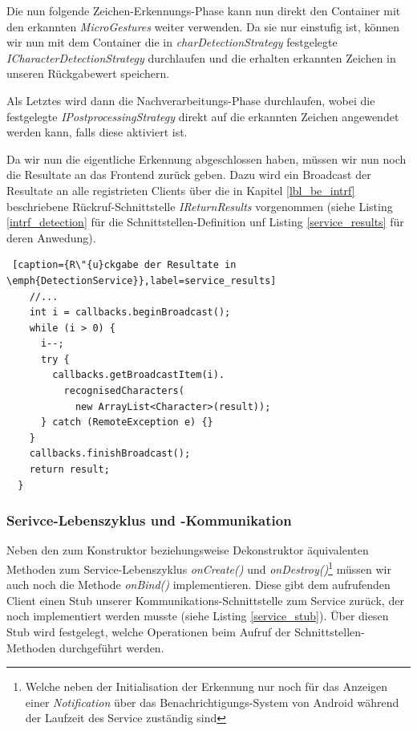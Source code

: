 Die nun folgende Zeichen-Erkennungs-Phase kann nun direkt den Container mit den erkannten \emph{MicroGestures} weiter verwenden. Da sie nur einstufig ist, können wir nun mit dem Container die in \emph{charDetectionStrategy} festgelegte \emph{ICharacterDetectionStrategy} durchlaufen und die erhalten erkannten Zeichen in unseren Rückgabewert speichern.

Als Letztes wird dann die Nachverarbeitungs-Phase durchlaufen, wobei die festgelegte \emph{IPostprocessingStrategy} direkt auf die erkannten Zeichen angewendet werden kann, falls diese aktiviert ist.

Da wir nun die eigentliche Erkennung abgeschlossen haben, müssen wir nun noch die Resultate an das Frontend zurück geben. Dazu wird ein Broadcast der Resultate an alle registrieten Clients über die in Kapitel \ref{lbl_be_intrf} beschriebene Rückruf-Schnittstelle \emph{IReturnResults} vorgenommen (siehe Listing \ref{intrf_detection} für die Schnittstellen-Definition unf Listing \ref{service_results} für deren Anwedung).

\begin{lstlisting} [caption={R\"{u}ckgabe der Resultate in \emph{DetectionService}},label=service_results]
    //...
    int i = callbacks.beginBroadcast();
    while (i > 0) {
      i--;
      try {
        callbacks.getBroadcastItem(i).
          recognisedCharacters(
            new ArrayList<Character>(result));
      } catch (RemoteException e) {}
    }
    callbacks.finishBroadcast();
    return result;
  }
\end{lstlisting}

\subsubsection{Serivce-Lebenszyklus und -Kommunikation}

Neben den zum Konstruktor beziehungsweise Dekonstruktor äquivalenten Methoden zum Service-Lebenszyklus \emph{onCreate()} und \emph{onDestroy()}\footnote{Welche neben der Initialisation der Erkennung nur noch für das Anzeigen einer \emph{Notification} über das Benachrichtigungs-System von Android während der Laufzeit des Service zuständig sind} müssen wir auch noch die Methode \emph{onBind()} implementieren. Diese gibt dem aufrufenden Client einen Stub unserer Kommunikations-Schnittstelle zum Service zurück, der noch implementiert werden musste (siehe Listing \ref{service_stub}). Über diesen Stub wird festgelegt, welche Operationen beim Aufruf der Schnittstellen-Methoden durchgeführt werden.

